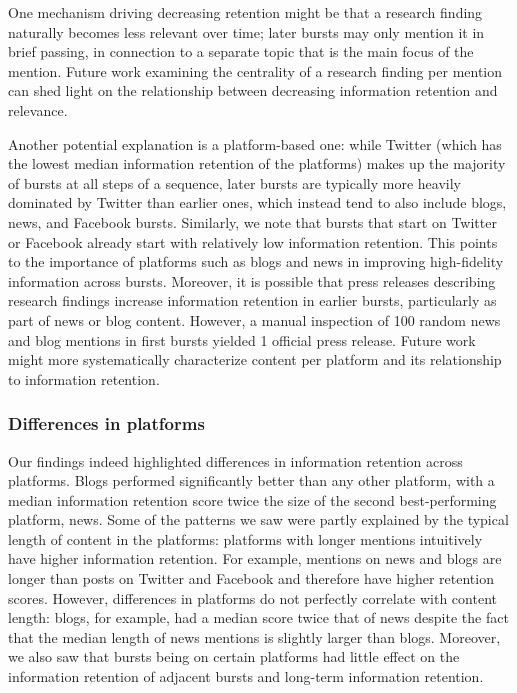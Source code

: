 \documentclass[letterpaper]{article} %
\begin{document}
One mechanism driving decreasing retention might be that a research finding naturally becomes less relevant over time; later bursts may only mention it in brief passing, in connection to a separate topic that is the main focus of the mention. Future work examining the centrality of a research finding per mention can shed light on the relationship between decreasing information retention and relevance.

Another potential explanation is a platform-based one: while Twitter (which has the lowest median information retention of the platforms) makes up the majority of bursts at all steps of a sequence, later bursts are typically more heavily dominated by Twitter than earlier ones, which instead tend to also include blogs, news, and Facebook bursts. Similarly, we note that bursts that start on Twitter or Facebook already start with relatively low information retention. This points to the importance of platforms such as blogs and news in improving high-fidelity information across bursts. Moreover, it is possible that press releases describing research findings increase information retention in earlier bursts, particularly as part of news or blog content. However, a manual inspection of %
100 random news and blog mentions in first bursts yielded 1 official press release. Future work might more systematically characterize content per platform and its relationship to information retention.

\subsubsection{Differences in platforms}
Our findings indeed highlighted differences in information retention across platforms. Blogs performed significantly better than any other platform, with a median information retention score twice the size of the second best-performing platform, news. Some of the patterns we saw were partly explained by the typical length of content in the platforms: platforms with longer mentions intuitively have higher information retention. For example, mentions on news and blogs are longer than posts on Twitter and Facebook and therefore have higher retention scores. However, differences in platforms do not perfectly correlate with content length: blogs, for example, had a median score twice that of news despite the fact that the median length of news mentions is slightly larger than blogs. Moreover, we also saw that bursts being on certain platforms had little effect on the information retention of adjacent bursts and long-term information retention.
\end{document}
